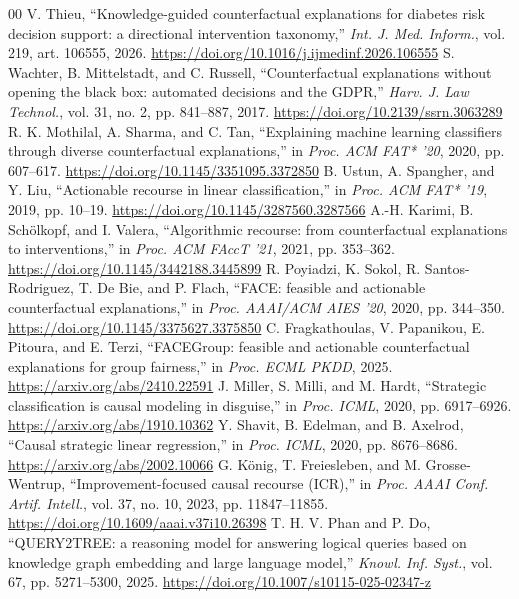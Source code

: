 \documentclass[conference]{IEEEtran}
\begin{document}
\begin{thebibliography}{00}
 V. Thieu, ``Knowledge-guided counterfactual explanations for diabetes risk decision support: a directional intervention taxonomy,'' \emph{Int. J. Med. Inform.}, vol. 219, art. 106555, 2026. \url{https://doi.org/10.1016/j.ijmedinf.2026.106555}
 S. Wachter, B. Mittelstadt, and C. Russell, ``Counterfactual explanations without opening the black box: automated decisions and the GDPR,'' \emph{Harv. J. Law Technol.}, vol. 31, no. 2, pp. 841--887, 2017. \url{https://doi.org/10.2139/ssrn.3063289}
 R. K. Mothilal, A. Sharma, and C. Tan, ``Explaining machine learning classifiers through diverse counterfactual explanations,'' in \emph{Proc. ACM FAT* '20}, 2020, pp. 607--617. \url{https://doi.org/10.1145/3351095.3372850}
 B. Ustun, A. Spangher, and Y. Liu, ``Actionable recourse in linear classification,'' in \emph{Proc. ACM FAT* '19}, 2019, pp. 10--19. \url{https://doi.org/10.1145/3287560.3287566}
 A.-H. Karimi, B. Sch\"olkopf, and I. Valera, ``Algorithmic recourse: from counterfactual explanations to interventions,'' in \emph{Proc. ACM FAccT '21}, 2021, pp. 353--362. \url{https://doi.org/10.1145/3442188.3445899}
 R. Poyiadzi, K. Sokol, R. Santos-Rodriguez, T. De Bie, and P. Flach, ``FACE: feasible and actionable counterfactual explanations,'' in \emph{Proc. AAAI/ACM AIES '20}, 2020, pp. 344--350. \url{https://doi.org/10.1145/3375627.3375850}
 C. Fragkathoulas, V. Papanikou, E. Pitoura, and E. Terzi, ``FACEGroup: feasible and actionable counterfactual explanations for group fairness,'' in \emph{Proc. ECML PKDD}, 2025. \url{https://arxiv.org/abs/2410.22591}
 J. Miller, S. Milli, and M. Hardt, ``Strategic classification is causal modeling in disguise,'' in \emph{Proc. ICML}, 2020, pp. 6917--6926. \url{https://arxiv.org/abs/1910.10362}
 Y. Shavit, B. Edelman, and B. Axelrod, ``Causal strategic linear regression,'' in \emph{Proc. ICML}, 2020, pp. 8676--8686. \url{https://arxiv.org/abs/2002.10066}
 G. K\"onig, T. Freiesleben, and M. Grosse-Wentrup, ``Improvement-focused causal recourse (ICR),'' in \emph{Proc. AAAI Conf. Artif. Intell.}, vol. 37, no. 10, 2023, pp. 11847--11855. \url{https://doi.org/10.1609/aaai.v37i10.26398}
 T. H. V. Phan and P. Do, ``QUERY2TREE: a reasoning model for answering logical queries based on knowledge graph embedding and large language model,'' \emph{Knowl. Inf. Syst.}, vol. 67, pp. 5271--5300, 2025. \url{https://doi.org/10.1007/s10115-025-02347-z}

\end{thebibliography}
\end{document}
